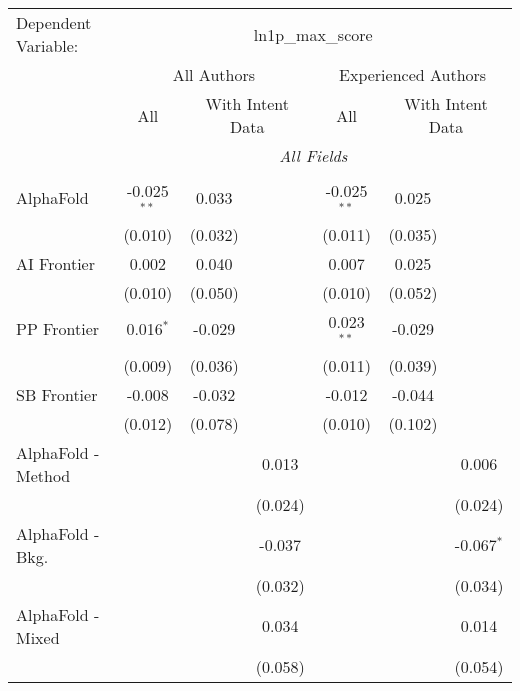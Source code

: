 \begingroup
\centering
\begin{tabular}{lcccccc}
   \tabularnewline \midrule \midrule
   Dependent Variable: & \multicolumn{6}{c}{ln1p\_max\_score}\\
 & \multicolumn{3}{c}{All Authors} & \multicolumn{3}{c}{Experienced Authors} \\
\cmidrule(lr){2-4} \cmidrule(lr){5-7}
 & \multicolumn{1}{c}{All} & \multicolumn{2}{c}{With Intent Data} & \multicolumn{1}{c}{All} & \multicolumn{2}{c}{With Intent Data} \\
\cmidrule(lr){2-2} \cmidrule(lr){3-4} \cmidrule(lr){5-5} \cmidrule(lr){6-7}
 & \multicolumn{6}{c}{\textit{All Fields}} \\ \\
   AlphaFold            & -0.025$^{**}$ & 0.033   &         & -0.025$^{**}$ & 0.025   &   \\   
                        & (0.010)       & (0.032) &         & (0.011)       & (0.035) &   \\   
   AI Frontier          & 0.002         & 0.040   &         & 0.007         & 0.025   &   \\   
                        & (0.010)       & (0.050) &         & (0.010)       & (0.052) &   \\   
   PP Frontier          & 0.016$^{*}$   & -0.029  &         & 0.023$^{**}$  & -0.029  &   \\   
                        & (0.009)       & (0.036) &         & (0.011)       & (0.039) &   \\   
   SB Frontier          & -0.008        & -0.032  &         & -0.012        & -0.044  &   \\   
                        & (0.012)       & (0.078) &         & (0.010)       & (0.102) &   \\   
   AlphaFold - Method   &               &         & 0.013   &               &         & 0.006\\   
                        &               &         & (0.024) &               &         & (0.024)\\   
   AlphaFold - Bkg.     &               &         & -0.037  &               &         & -0.067$^{*}$\\   
                        &               &         & (0.032) &               &         & (0.034)\\   
   AlphaFold - Mixed    &               &         & 0.034   &               &         & 0.014\\   
                        &               &         & (0.058) &               &         & (0.054)\\   

\end{tabular}
